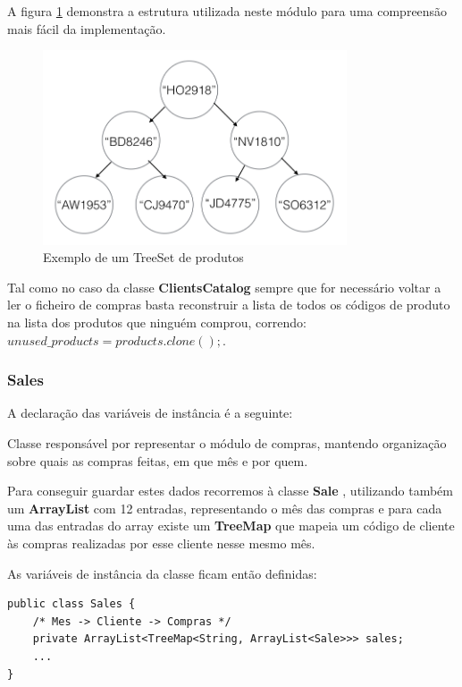 \documentclass[10pt] {article}
\begin{document}
\par A figura \ref{fig:catprodutos} demonstra a estrutura utilizada neste módulo para uma compreensão mais fácil da implementação.

\begin{figure}[ht!]
\centering
\includegraphics[width=90mm]{catprodutos.png}
\caption{Exemplo de um TreeSet de produtos}
\label{fig:catprodutos}
\end{figure}

Tal como no caso da classe \color{blue} \textbf{ClientsCatalog} \color{black} sempre que for necessário voltar a ler o ficheiro de
compras basta reconstruir a lista de todos os códigos de produto na lista dos produtos que ninguém comprou, correndo:
$unused\_products = products.clone();$.

\newpage

\subsubsection{Sales\label{compras}}


A declaração das variáveis de instância é a seguinte:

\par Classe responsável por representar o módulo de compras, mantendo organização sobre quais as compras feitas, em que
mês e por quem.
\par Para conseguir guardar estes dados recorremos à classe \color{blue} \textbf{Sale} \color{black}, utilizando também um
\color{blue} \textbf{ArrayList} \color{black} com 12 entradas, representando o mês das compras e para cada uma das
entradas do array existe um \color{blue} \textbf{TreeMap} \color{black} que mapeia um código de cliente às compras
realizadas por esse cliente nesse mesmo mês.
\par As variáveis de instância da classe ficam então definidas:

\begin{lstlisting}
public class Sales {
	/* Mes -> Cliente -> Compras */
	private ArrayList<TreeMap<String, ArrayList<Sale>>> sales;
	...
}
\end{lstlisting}
\end{document}
